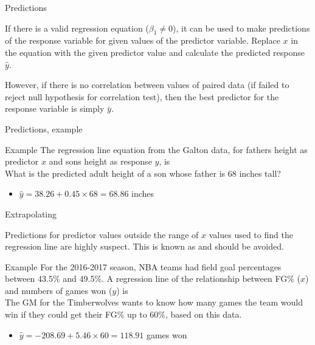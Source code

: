 \documentclass[xcolor=table, aspectratio=169, bigger]{beamer}
\begin{document}
\begin{frame}{Predictions}
\begin{block}{}
If there is a valid regression equation ($\beta_1 \ne 0$), it can be used to make predictions of the response variable for given values of the predictor variable. Replace $x$ in the equation with the given predictor value and calculate the predicted response $\hat y$.
\end{block}

\pause
\begin{block}{}
However, if there is no correlation between values of paired data (if failed to reject null hypothesis for correlation test), then the best predictor for the response variable is simply $\bar y$.
\end{block}

\end{frame}

\begin{frame}{Predictions, example}
\begin{exampleblock}{Example}
The regression line equation from the Galton data, for fathers height as predictor $x$ and sons height as response $y$, is \\
\smallskip
{}
\medskip
What is the predicted adult height of a son whose father is 68 inches tall?
\begin{itemize}
\pause\item $\hat y = 38.26 + 0.45 \times 68 = 68.86$ inches
\end{itemize}
\end{exampleblock}
\end{frame}

\begin{frame}{Extrapolating}
\begin{block}{}
Predictions for predictor values outside the range of $x$ values used to find the regression line are highly suspect. This is known as  and should be avoided.
\end{block}

\pause
\begin{exampleblock}{Example}
For the 2016-2017 season, NBA teams had field goal percentages between 43.5\% and 49.5\%. A regression line of the relationship between FG\% ($x$) and numbers of games won ($y$) is  \\
\medskip
The GM for the Timberwolves wants to know how many games the team would win if they could get their FG\% up to 60\%, based on this data.
\begin{itemize}
\pause\item $\hat y = -208.69 + 5.46 \times 60 = 118.91$ games won
\end{itemize}

\end{exampleblock}

\end{frame}
\end{document}
